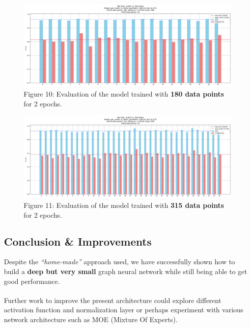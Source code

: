 \documentclass[11pt]{article}
\begin{document}
	\begin{figure}[h!] %
		\centering
		\includegraphics[width=1\textwidth]{images/test_auc_20_gat_model_v1_ReLU_LayerNorm_128_64_4x2_d_0.75_180_2_20250202-112112.jpg}
		\caption{Figure 10: Evaluation of the model trained with \textbf{180 data points} for 2 epochs.}
		\label{figure_10}
	\end{figure}
	
	\begin{figure}[h!]
		\centering
		\includegraphics[width=1\textwidth]{images/test_auc_35_gat_model_v1_ReLU_LayerNorm_128_64_4x2_d_0.75_315_2_20250202-134130.jpg}
		\caption{Figure 11: Evaluation of the model trained with \textbf{315 data points} for 2 epochs.}
		\label{figure_11}
	\end{figure}
	
	\clearpage
	\subsection{Conclusion \& Improvements}
	Despite the \textit{``home-made''} approach used, we have successfully shown how to build a \textbf{deep but very small} graph neural network while still being able to get good performance.\\\\
	Further work to improve the present architecture could explore different activation function and normalization layer or perhaps experiment with various network architecture such as MOE (Mixture Of Experts).       
\end{document}
